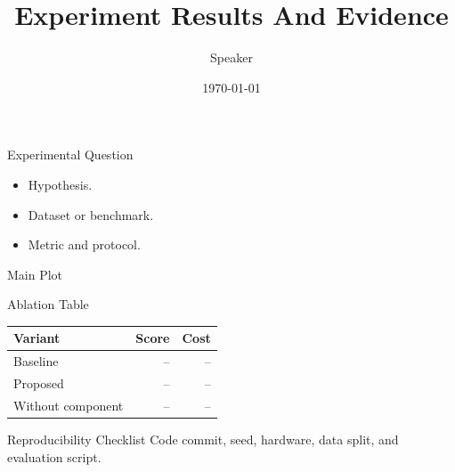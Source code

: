 \documentclass[10pt,aspectratio=169]{beamer}
\title{Experiment Results And Evidence}
\author{Speaker}
\date{\today}
\begin{document}
\begin{frame}\titlepage\end{frame}

\begin{frame}{Experimental Question}
  \begin{itemize}
    \item Hypothesis.
    \item Dataset or benchmark.
    \item Metric and protocol.
  \end{itemize}
\end{frame}

\begin{frame}{Main Plot}
  \centering
\end{frame}

\begin{frame}{Ablation Table}
  \begin{tabular}{lrr}
    \toprule
    Variant & Score & Cost \\
    \midrule
    Baseline & -- & -- \\
    Proposed & -- & -- \\
    Without component & -- & -- \\
    \bottomrule
  \end{tabular}
\end{frame}

\begin{frame}{Reproducibility Checklist}
  Code commit, seed, hardware, data split, and evaluation script.
\end{frame}
\end{document}
